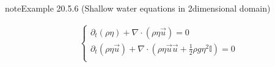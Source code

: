 \documentclass[letterpaper,10pt,english]{jupyterBook}
\begin{document}
\label{ch/pde/hyperbolic:example-9}
\begin{sphinxadmonition}{note}{Example 20.5.6 (Shallow water equations in 2\sphinxhyphen{}dimensional domain)}


\begin{equation*}
\begin{split}\begin{cases}
  \partial_t (\rho \eta) + \nabla \cdot (\rho \eta \vec{u}) = 0 \\
  \partial_t (\rho \eta \vec{u}) + \nabla \cdot \left(\rho \eta \vec{u} \vec{u} + \frac{1}{2} \rho g \eta^2 \mathbb{I} \right) = 0 \\
\end{cases}\end{split}
\end{equation*}\end{sphinxadmonition}

\sphinxstepscope
\end{document}
